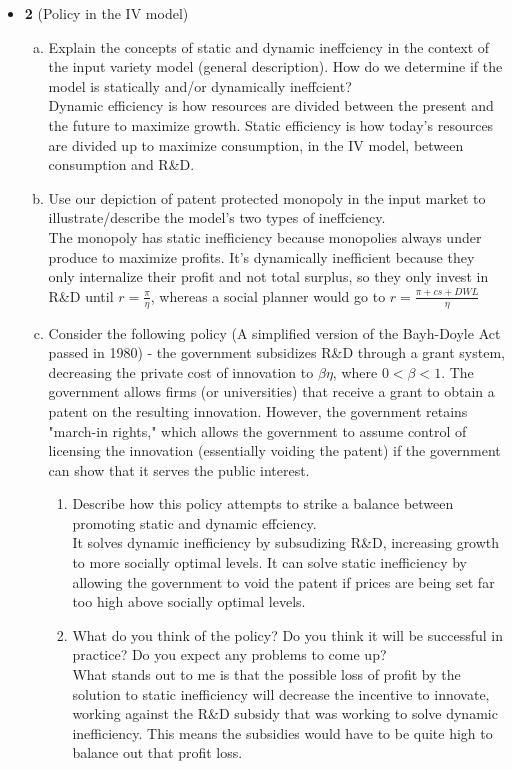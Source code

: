 \documentclass[11pt]{article}
\begin{document}
\begin{itemize}
\item \textbf{2} 
(Policy in the IV model)
\begin{enumerate}[(a)]
\item Explain the concepts of static and dynamic ineffciency in the context of the input variety model (general description). How do we determine if the model is statically and/or dynamically ineffcient?
\\Dynamic efficiency is how resources are divided between the present and the future to maximize growth. Static efficiency is how today's resources are divided up to maximize consumption, in the IV model, between consumption and R\&D.
\item Use our depiction of patent protected monopoly in the input market to illustrate/describe the model's two types of ineffciency.
\\The monopoly has static inefficiency because monopolies always under produce to maximize profits. It's dynamically inefficient because they only internalize their profit and not total surplus, so they only invest in R\&D until $r=\frac{\pi}{\eta}$, whereas a social planner would go to $r=\frac{\pi+cs+DWL}{\eta}$
\item Consider the following policy (A simplified version of the Bayh-Doyle Act passed in 1980) - the government subsidizes R\&D through a grant system, decreasing the private cost of innovation to $\beta\eta$, where $0 < \beta < 1$. The government allows firms (or universities) that receive a grant to obtain a patent on the resulting innovation. However, the government retains "march-in rights," which allows the government to assume control of licensing the innovation (essentially voiding the patent) if the government can show that it serves the public interest.
\begin{enumerate}
\item Describe how this policy attempts to strike a balance between promoting static and dynamic effciency.
\\It solves dynamic inefficiency by subsudizing R\&D, increasing growth to more socially optimal levels. It can solve static inefficiency by allowing the government to void the patent if prices are being set far too high above socially optimal levels.
\item What do you think of the policy? Do you think it will be successful in practice? Do you expect any problems to come up?
\\What stands out to me is that the possible loss of profit by the solution to static inefficiency will decrease the incentive to innovate, working against the R\&D subsidy that was working to solve dynamic inefficiency. This means the subsidies would have to be quite high to balance out that profit loss.
\end{enumerate}
\end{enumerate}

\end{itemize}
\end{document}

